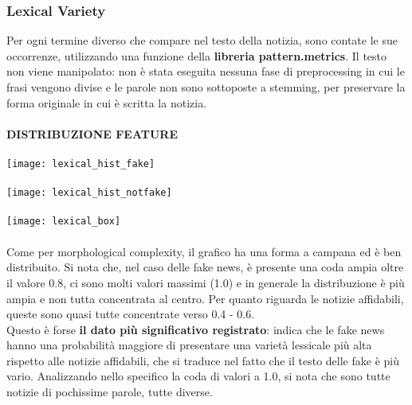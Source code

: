 \documentclass{article}
\begin{document}
\begin{multicols}{2}
				\subsubsection{Lexical Variety}
				Per ogni termine diverso che compare nel testo della notizia, sono contate le sue occorrenze, utilizzando una funzione della \textbf{libreria pattern.metrics}. Il testo non viene manipolato: non è stata eseguita nessuna fase di preprocessing in cui le frasi vengono divise e le parole non sono sottoposte a stemming, per preservare la forma originale in cui è scritta la notizia.
				\\~\\								
				\textbf{DISTRIBUZIONE FEATURE}						
				\\~\\
				\texttt{[image: lexical\_hist\_fake]}
				\\~\\
				\texttt{[image: lexical\_hist\_notfake]}
				\\~\\
				\texttt{[image: lexical\_box]}
				\\~\\
				Come per morphological complexity, il grafico ha una forma a campana ed è ben distribuito. Si nota che, nel caso delle fake news, è presente una coda ampia oltre il valore 0.8, ci sono molti valori massimi (1.0) e in generale la distribuzione è più ampia e non tutta concentrata al centro. Per quanto riguarda le notizie affidabili, queste sono quasi tutte concentrate verso 0.4 - 0.6.\\
				Questo è forse \textbf{il dato più significativo registrato}: indica che le fake news hanno una probabilità maggiore di presentare una varietà lessicale più alta rispetto alle notizie affidabili, che si traduce nel fatto che il testo delle fake è più vario. Analizzando nello specifico la coda di valori a 1.0, si nota che sono tutte notizie di pochissime parole, tutte diverse.\\~\\
				

\end{multicols}
\end{document}
